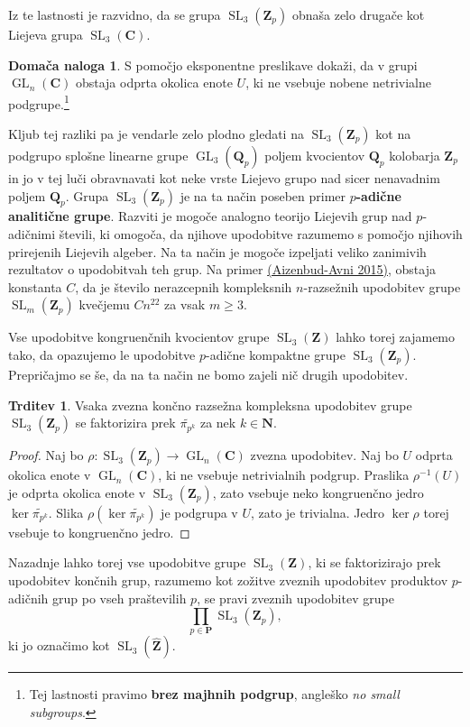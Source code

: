 \documentclass[11pt]{book}
\def\NN{\mathbf{N}}
\def\ZZ{\mathbf{Z}}
\def\QQ{\mathbf{Q}}
\def\CC{\mathbf{C}}
\def\PP{\mathbf{P}}
\DeclareMathOperator\GL{GL}
\DeclareMathOperator\SL{SL}
\def\definicija{\color{rdeca}\bf}
\theoremstyle{definition}
\theoremstyle{zgled}
\theoremstyle{zgledbrezstevilke}
\theoremstyle{odprtproblem}
\theoremstyle{domacanaloga}
\newtheorem{domacanaloga}[theorem]{Domača naloga}
\newenvironment{dokaz}
    {\color{siva}\begin{proof}}
    {\end{proof}}
\theoremstyle{izrek}
\newtheorem{trditev}[theorem]{Trditev}
\begin{document}
Iz te lastnosti je razvidno, da se grupa $\SL_3(\ZZ_p)$ obnaša zelo drugače kot Liejeva grupa $\SL_3(\CC)$.

\begin{domacanaloga}
S pomočjo eksponentne preslikave dokaži, da v grupi $\GL_n(\CC)$ obstaja odprta okolica enote $U$, ki ne vsebuje nobene netrivialne podgrupe.\footnote{Tej lastnosti pravimo {\definicija brez majhnih podgrup}, angleško \emph{no small subgroups}.}
\end{domacanaloga}

Kljub tej razliki pa je vendarle zelo plodno gledati na $\SL_3(\ZZ_p)$ kot na podgrupo splošne linearne grupe $\GL_3(\QQ_p)$ poljem kvocientov $\QQ_p$ kolobarja $\ZZ_p$ in jo v tej luči obravnavati kot neke vrste Liejevo grupo nad sicer nenavadnim poljem $\QQ_p$. Grupa $\SL_3(\ZZ_p)$ je na ta način poseben primer {\definicija $p$-adične analitične grupe}. Razviti je mogoče analogno teorijo Liejevih grup nad $p$-adičnimi števili, ki omogoča, da njihove upodobitve razumemo s pomočjo njihovih prirejenih Liejevih algeber. Na ta način je mogoče izpeljati veliko zanimivih rezultatov o upodobitvah teh grup. Na primer \href{https://link.springer.com/article/10.1007/s00222-015-0614-8}{(Aizenbud-Avni 2015)}, obstaja konstanta $C$, da je število nerazcepnih kompleksnih $n$-razsežnih upodobitev grupe $\SL_m(\ZZ_p)$ kvečjemu $C n^{22}$ za vsak $m \geq 3$.

Vse upodobitve kongruenčnih kvocientov grupe $\SL_3(\ZZ)$ lahko torej zajamemo tako, da opazujemo le upodobitve $p$-adične kompaktne grupe $\SL_3(\ZZ_p)$. Prepričajmo se še, da na ta način ne bomo zajeli nič drugih upodobitev.

\begin{trditev}
Vsaka zvezna končno razsežna kompleksna upodobitev grupe $\SL_3(\ZZ_p)$ se faktorizira prek $\widetilde{\pi_{p^k}}$ za nek $k \in \NN$.
\end{trditev}
\begin{dokaz}
Naj bo $\rho \colon \SL_3(\ZZ_p) \to \GL_n(\CC)$ zvezna upodobitev. Naj bo $U$ odprta okolica enote v $\GL_n(\CC)$, ki ne vsebuje netrivialnih podgrup. Praslika $\rho^{-1}(U)$ je odprta okolica enote v $\SL_3(\ZZ_p)$, zato vsebuje neko kongruenčno jedro $\ker \widetilde{\pi_{p^k}}$. Slika $\rho(\ker \widetilde{\pi_{p^k}})$ je podgrupa v $U$, zato je trivialna. Jedro $\ker \rho$ torej vsebuje to kongruenčno jedro.
\end{dokaz}

Nazadnje lahko torej vse upodobitve grupe $\SL_3(\ZZ)$, ki se faktorizirajo prek upodobitev končnih grup, razumemo kot zožitve zveznih upodobitev produktov $p$-adičnih grup po vseh praštevilih $p$, se pravi zveznih upodobitev grupe
\[
    \prod_{p \in \PP} {\textstyle \SL_3(\ZZ_p)},
\]
ki jo označimo kot $\SL_3(\widehat{\ZZ})$.
\end{document}
